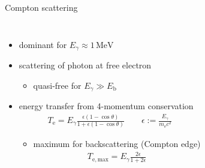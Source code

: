 \documentclass[11pt,xcolor=dvipsnames,professionalfonts,notes]{beamer}
\begin{document}
\begin{frame}{Compton scattering}
\begin{columns}
	\begin{itemize}
		\setlength\itemsep{1.5em}
		\item dominant for $E_\gamma \approx 1 \, \mathrm{MeV}$
		
		\item scattering of photon at free electron
		\begin{itemize}
			\item quasi-free for $E_\gamma \gg E_\mathrm{b}$
		\end{itemize}
		
		\item energy transfer from 4-momentum conservation
		\begin{align*}
			T_\mathrm{e} = E_\gamma \frac{\epsilon (1 - \cos\theta)}{1 + \epsilon (1 - \cos\theta)} \qquad \epsilon := \frac{E_\gamma}{m_\mathrm{e}c^2}
		\end{align*}
		\begin{itemize}
			\item maximum for backscattering (Compton edge)
			\begin{align*}
				T_\mathrm{e, max} = E_\gamma \frac{2\epsilon}{1+ 2\epsilon}
			\end{align*}
		\end{itemize}
		
	\end{itemize}
	

\end{columns}
\end{frame}
\end{document}
